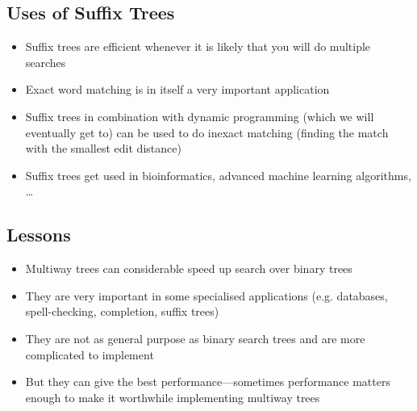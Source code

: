 \begin{slide}
\section{Uses of Suffix Trees}

\begin{PauseHighLight}
  \begin{itemize}
  \item Suffix trees are efficient whenever it is likely that you will
    do multiple searches\pause
  \item Exact word matching is in itself a very important application\pause
  \item Suffix trees in combination with dynamic programming (which we
    will eventually get to) can be used to do inexact matching (finding
    the match with the smallest edit distance)\pause
  \item Suffix trees get used in bioinformatics, advanced machine
    learning algorithms, \ldots\pause
  \end{itemize}
\end{PauseHighLight}

\end{slide}


\begin{slide}
\section{Lessons}

\begin{PauseHighLight}
  \begin{itemize}
  \item Multiway trees can considerable speed up search over binary
    trees\pause
  \item They are very important in some specialised applications
    (e.g. databases, spell-checking, completion, suffix trees)\pause
  \item They are not as general purpose as binary search trees and are
    more complicated to implement\pause
  \item But they can give the best performance\pause---sometimes
    performance matters enough to make it worthwhile implementing
    multiway trees\pauseb
  \end{itemize}
\end{PauseHighLight}

\end{slide}
